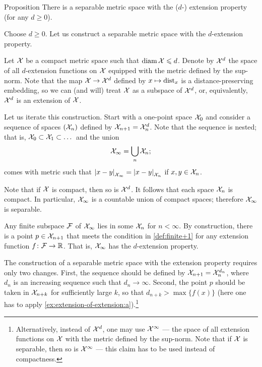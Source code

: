 \begin{thm}{Proposition}\label{prop:univeral-separable}
There is a separable metric space with the ($d$-) extension property (for any $d\ge 0$).
\end{thm}

Choose $d\ge 0$.
Let us construct a separable metric space with  the $d$-extension property.

Let $\mathcal{X}$ be a compact metric space such that $\operatorname{\rm diam}\nolimits\mathcal{X}\leqslant d$.
Denote by $\mathcal{X}^d$ the space of all $d$-extension functions on $\mathcal{X}$ equipped with the metric defined by the sup-norm.
Note that the map $\mathcal{X} \to \mathcal{X}^d$ defined by $x\mapsto\mathrm{dist}_x$ is a distance-preserving embedding,
so we can (and will) treat $\mathcal{X}$ as a subspace of $\mathcal{X}^d$, or, equivalently, $\mathcal{X}^d$ is an extension of $\mathcal{X}$.

Let us iterate this construction.
Start with a one-point space $\mathcal{X}_0$ and consider a sequence of spaces $(\mathcal{X}_n)$ defined by $\spc{X}_{n+1}\z=\spc{X}_n^d$.
Note that the sequence is nested;
that is, $\mathcal{X}_0\subset \mathcal{X}_1\subset\dots$
and the union
\[\mathcal{X}_\infty=\bigcup_n\mathcal{X}_n;\]
comes with metric such that
$\dist{x}{y}{\spc{X}_\infty} = \dist{x}{y}{\spc{X}_n}$
if $x,y\in\mathcal{X}_n$.

Note that if $\mathcal{X}$ is compact, then so is $\mathcal{X}^d$.
It follows that each space $\mathcal{X}_n$ is compact.
In particular, $\mathcal{X}_\infty$ is a countable union of compact spaces;
therefore $\mathcal{X}_\infty$ is separable.

Any finite subspace $\mathcal{F}$ of $\mathcal{X}_\infty$ lies in some $\mathcal{X}_n$ for $n<\infty$.
By construction, there is a point $p\in \mathcal{X}_{n+1}$ that meets the condition in \ref{def:finite+1} for any extension function $f\colon\mathcal{F}\to\mathbb{R}$.
That is, $\mathcal{X}_\infty$ has the $d$-extension property.

The construction of a separable metric space with the extension property requires only two changes.
First, the sequence should be defined by $\spc{X}_{n+1}\z=\spc{X}_n^{d_n}$, where $d_n$ is an increasing sequence such that $d_n\to\infty$.
Second, the point $p$ should be taken in $\mathcal{X}_{n+k}$ for sufficiently large $k$, so that $d_{n+k}>\max\{f(x)\}$
(here one has to apply \ref{ex:extension-of-extension:a}).\footnote{Alternatively, instead of $\mathcal{X}^d$, one may use $\mathcal{X}^\infty$ --- the space of all extension functions on $\mathcal{X}$ with the metric defined by the sup-norm.
Note that if $\mathcal{X}$ is separable, then so is $\mathcal{X}^\infty$ --- this claim has to be used instead of compactness.}
\qeds

